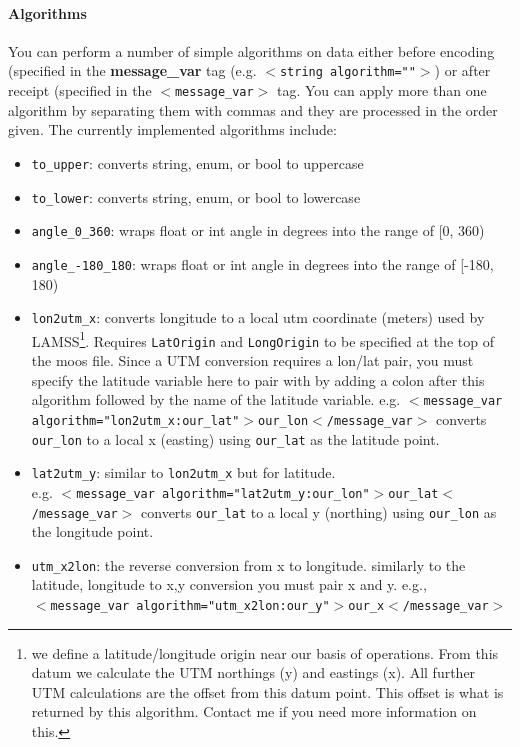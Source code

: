 \documentclass[11pt, letterpaper, oneside]{memoir}
\newcommand{\xmltag}[1]{\texttt{$<$#1$>$}}
\begin{document}
\paragraph{Algorithms}
You can perform a number of simple algorithms on data either before encoding (specified in the \textbf{message\_var} tag (e.g. \xmltag{string algorithm=""}) or after receipt (specified in the \xmltag{message\_var} tag. You can apply more than one algorithm by separating them with commas and they are processed in the order given. The currently implemented algorithms include:
\begin{itemize}
\item \verb|to_upper|: converts string, enum, or bool to uppercase
\item \verb|to_lower|: converts string, enum, or bool to lowercase
\item \verb|angle_0_360|: wraps float or int angle in degrees into the range of [0, 360)
\item \verb|angle_-180_180|: wraps float or int angle in degrees into the range of [-180, 180)
\item \verb|lon2utm_x|: converts longitude to a local utm coordinate (meters) used by LAMSS\footnote{we define a latitude/longitude origin near our basis of operations. From this datum we calculate the UTM northings (y) and eastings (x). All further UTM calculations are the offset from this datum point. This offset is what is returned by this algorithm. Contact me if you need more information on this.}. Requires \verb|LatOrigin| and \verb|LongOrigin| to be specified at the top of the moos file. Since a UTM conversion requires a lon/lat pair, you must specify the latitude variable here to pair with by adding a colon after this algorithm followed by the name of the latitude variable. e.g. \xmltag{message\_var algorithm="lon2utm\_x:our\_lat"$>$our\_lon$<$/message\_var} converts \verb|our_lon| to a local x (easting) using \verb|our_lat| as the latitude point.
\item \verb|lat2utm_y|: similar to \verb|lon2utm_x| but for latitude. \\ e.g. \xmltag{message\_var algorithm="lat2utm\_y:our\_lon"$>$our\_lat$<$/message\_var} converts \verb|our_lat| to a local y (northing) using \verb|our_lon| as the longitude point.
\item \verb|utm_x2lon|: the reverse conversion from x to longitude. similarly to the latitude, longitude to x,y conversion you must pair x and y. e.g., \\ \xmltag{message\_var algorithm="utm\_x2lon:our\_y"$>$our\_x$<$/message\_var}

\end{itemize}
\end{document}
